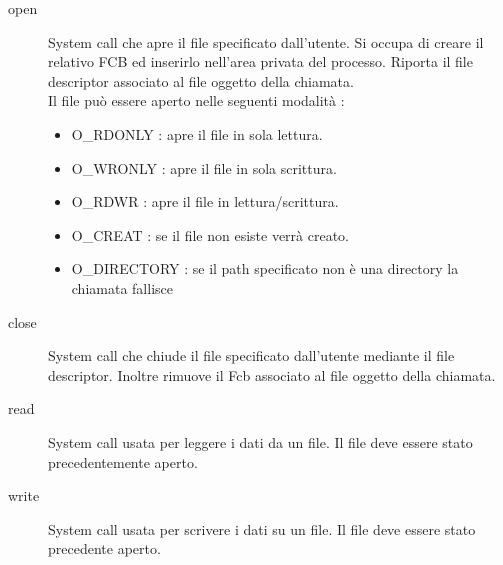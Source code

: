      
     \begin{description}
      \item[open]
	System call che apre il file specificato dall'utente. Si occupa di creare il relativo FCB ed inserirlo nell'area privata del processo.
	Riporta il file descriptor associato al file oggetto della chiamata.\\
	Il file può essere aperto nelle seguenti modalità : \\
	  \begin{itemize}
	   \item O\_RDONLY   :   apre il file in sola lettura.\\			
 	   \item O\_WRONLY   :   apre il file in sola scrittura.\\				
 	   \item O\_RDWR     :   apre il file in lettura/scrittura.\\			
 	  \item  O\_CREAT    :   se il file non esiste verrà creato.\\			
 	   \item O\_DIRECTORY :   se il path specificato non è una directory la chiamata fallisce  \\ 
       \end{itemize}
     \end{description}
      
      \begin{description}
       \item[close]
	System call che chiude il file specificato dall'utente mediante il file descriptor. Inoltre rimuove il Fcb associato al file oggetto della chiamata.
       \end{description}
       
       \begin{description}
        \item[read] System call usata per leggere i dati da un file. Il file deve essere stato precedentemente aperto.
       \end{description}

        \begin{description}
         \item[write] System call usata per scrivere i dati su un file. Il file deve essere stato precedente aperto. 
         \end{description}

